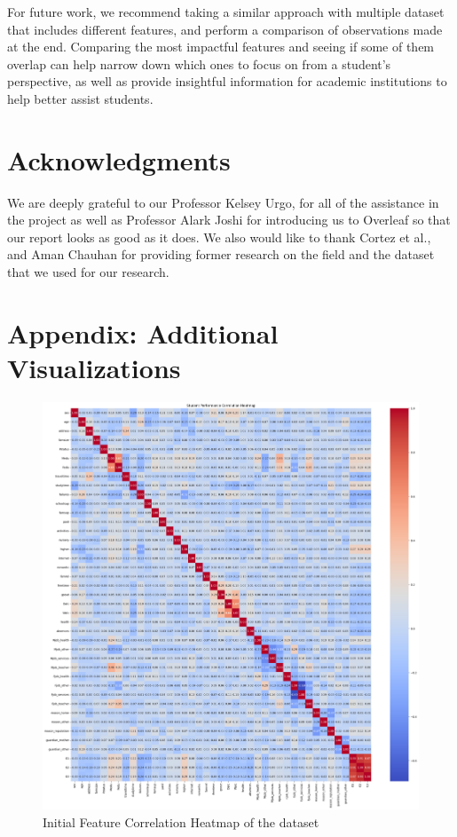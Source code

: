 \documentclass[11pt,a4paper]{article}
\begin{document}
For future work, we recommend taking a similar approach with multiple dataset that includes different features, and perform a comparison of observations made at the end. Comparing the most impactful features and seeing if some of them overlap can help narrow down which ones to focus on from a student's perspective, as well as provide insightful information for academic institutions to help better assist students.

\section*{Acknowledgments}
We are deeply grateful to our Professor Kelsey Urgo, for all of the assistance in the project as well as Professor Alark Joshi for introducing us to Overleaf so that our report looks as good as it does. We also would like to thank Cortez et al., and Aman Chauhan for providing former research on the field and the dataset that we used for our research.




\appendix
\section{Appendix: Additional Visualizations}
\label{sec:addvis}
\begin{figure} [H]
\centering %
\includegraphics[width=15cm]{init_heatmap.png}
\caption{Initial Feature Correlation Heatmap of the dataset}
\label{fig:initheatmap}
\end{figure}
\end{document}
